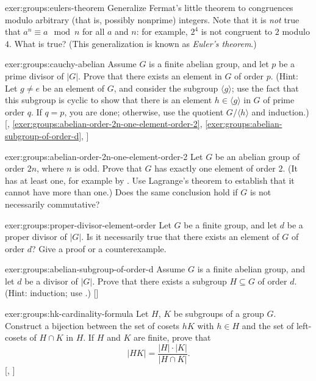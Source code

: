 \begin{exer}{}{exer:groups:eulers-theorem}
  Generalize Fermat's little theorem to congruences modulo arbitrary
  (that is, possibly nonprime) integers. Note that it is \emph{not}
  true that $a^n \equiv a \mod n$ for all $a$ and $n$: for example,
  $2^4$ is not congruent to $2$ modulo $4$. What is true? (This
  generalization is known as \emph{Euler's theorem}.)
\end{exer}
\begin{exer}{\exerused}{exer:groups:cauchy-abelian}
  Assume $G$ is a finite abelian group, and let $p$ be a prime divisor
  of $|G|$. Prove that there exists an element in $G$ of order
  $p$. (Hint: Let $g \neq e$ be an element of $G$, and consider the
  subgroup
  $\langle g \rangle$; use the fact that this subgroup is cyclic to
  show that there is an element $h \in \langle g \rangle$ in $G$ of
  prime order $q$. If $q = p$, you are done; otherwise, use the
  quotient $G/\langle h \rangle$ and induction.)
  [,
  \ref{exer:groups:abelian-order-2n-one-element-order-2},
  \ref{exer:groups:abelian-subgroup-of-order-d},
  ]
\end{exer}
\begin{exer}{}{exer:groups:abelian-order-2n-one-element-order-2}
  Let $G$ be an abelian group of order $2n$, where $n$ is odd. Prove
  that $G$ has exactly one element of order $2$. (It has at least one,
  for example by . Use Lagrange's
  theorem to establish that it cannot have more than one.) Does the
  same conclusion hold if $G$ is not necessarily commutative?
\end{exer}
\begin{exer}{}{exer:groups:proper-divisor-element-order}
  Let $G$ be a finite group, and let $d$ be a proper divisor of
  $|G|$. Is it necessarily true that there exists an element of $G$ of
  order $d$?  Give a proof or a counterexample.
\end{exer}
\begin{exer}{\exerused}{exer:groups:abelian-subgroup-of-order-d}
  Assume $G$ is a finite abelian group, and let $d$ be a divisor of
  $|G|$. Prove that there exists a subgroup $H \subseteq G$ of order
  $d$.  (Hint: induction; use .)
  []
\end{exer}
\begin{exer}{\exerused}{exer:groups:hk-cardinality-formula}
  Let $H$, $K$ be subgroups of a group $G$. Construct a bijection
  between the set of cosets $hK$ with $h \in H$ and the set of
  left-cosets of $H \cap K$ in $H$. If $H$ and $K$ are finite, prove
  that
  \[
    |HK| = \frac{|H| \cdot |K|}{|H \cap K|}.
  \] [,
  ]
\end{exer}
